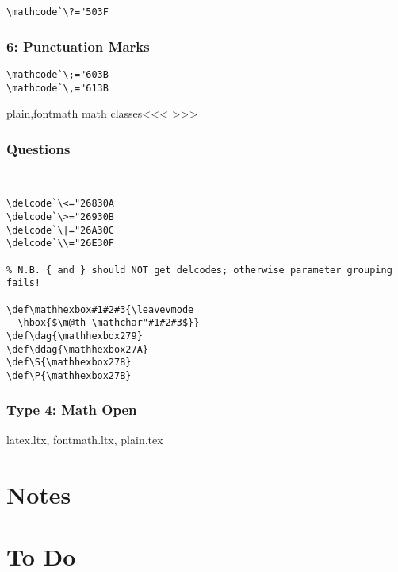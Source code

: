 {{\begin{verbatim}
\mathcode`\?="503F
\end{verbatim}


\subsection{6: Punctuation Marks}

\begin{verbatim}
\mathcode`\;="603B
\mathcode`\,="613B
\end{verbatim}

\<plain,fontmath math classes\><<<
>>>


\subsection{Questions}

\begin{verbatim}


\delcode`\<="26830A
\delcode`\>="26930B
\delcode`\|="26A30C
\delcode`\\="26E30F

% N.B. { and } should NOT get delcodes; otherwise parameter grouping fails!

\def\mathhexbox#1#2#3{\leavevmode
  \hbox{$\m@th \mathchar"#1#2#3$}}
\def\dag{\mathhexbox279}
\def\ddag{\mathhexbox27A}
\def\S{\mathhexbox278}
\def\P{\mathhexbox27B}
\end{verbatim}


\subsection{Type 4: Math Open}


latex.ltx, fontmath.ltx, plain.tex


\chapter{Notes}

\chapter{To Do}

}}
